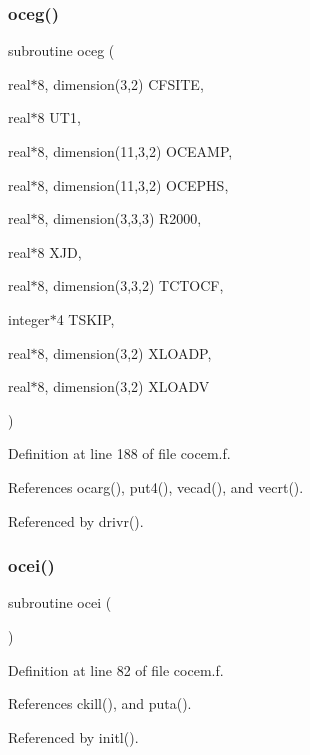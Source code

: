 \subsubsection{\texorpdfstring{oceg()}{oceg()}}
{\footnotesize\ttfamily subroutine oceg (\begin{DoxyParamCaption}\item[{real$\ast$8, dimension(3,2)}]{C\+F\+S\+I\+TE,  }\item[{real$\ast$8}]{U\+T1,  }\item[{real$\ast$8, dimension(11,3,2)}]{O\+C\+E\+A\+MP,  }\item[{real$\ast$8, dimension(11,3,2)}]{O\+C\+E\+P\+HS,  }\item[{real$\ast$8, dimension(3,3,3)}]{R2000,  }\item[{real$\ast$8}]{X\+JD,  }\item[{real$\ast$8, dimension(3,3,2)}]{T\+C\+T\+O\+CF,  }\item[{integer$\ast$4}]{T\+S\+K\+IP,  }\item[{real$\ast$8, dimension(3,2)}]{X\+L\+O\+A\+DP,  }\item[{real$\ast$8, dimension(3,2)}]{X\+L\+O\+A\+DV }\end{DoxyParamCaption})}



Definition at line 188 of file cocem.\+f.



References ocarg(), put4(), vecad(), and vecrt().



Referenced by drivr().

\mbox{\label{cocem_8f_aed92fd2616eadf325988953474a7bf01}} 
\subsubsection{\texorpdfstring{ocei()}{ocei()}}
{\footnotesize\ttfamily subroutine ocei (\begin{DoxyParamCaption}{ }\end{DoxyParamCaption})}



Definition at line 82 of file cocem.\+f.



References ckill(), and puta().



Referenced by initl().

